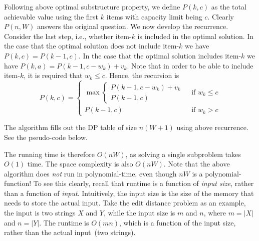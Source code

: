 Following above optimal substructure property,
we define $P(k, c)$ as the total achievable value using the first $k$ items with capacity limit being $c$.
Clearly $P(n, W)$ answers the original question.
We now develop the recurrence.
Consider the last step, i.e., whether item-$k$ is included in the optimal solution.
In the case that the optimal solution does not include item-$k$ we have $P(k,c) = P(k-1,c)$.
In the case that the optimal solution includes item-$k$ we have $P(k,a) = P(k-1,c-w_k) + v_k$.
Note that in order to be able to include item-$k$, it is required that $w_k \le c$.
Hence, the recursion is
\begin{displaymath}
P(k,c) = 
\left\{
	\begin{array}{lllll}
	 \max \left\{
			\begin{array}{lllll}
			P(k-1,c-w_k) + v_k\\
			P(k-1,c)
			\end{array}
		\right. & \textrm{ if } w_k \le c \\
	P(k-1,c) & \textrm{ if } w_k > c
	\end{array}
\right.
\end{displaymath}

The algorithm fills out the DP table of size $n(W+1)$
using above recurrence. 
See the pseudo-code below.

\begin{algorithmblock}[0.8\textwidth]
	\xxx
	\xxx
	\xxx
	\xxx
	\xxx
	\xxx
	\xxx
	\xxx
	\xxx
\end{algorithmblock}


The running time is therefore $O(nW)$, as solving
a single subproblem takes $O(1)$ time. The space complexity is also $O(nW)$.
Note that the above algorithm does \emph{not} run in polynomial-time,
even though $nW$ is a polynomial-function!
To see this clearly, recall that runtime is a function of \emph{input size},
rather than a function of \emph{input}.
Intuitively, the input size is the size of the memory that needs to store the actual input.
Take the edit distance problem as an example, the input is two strings $X$ and $Y$,
while the input size is $m$ and $n$, where $m=|X|$ and $n=|Y|$.
The runtime is $O(mn)$, which is a function of the input size, rather than the actual input~(two strings).

